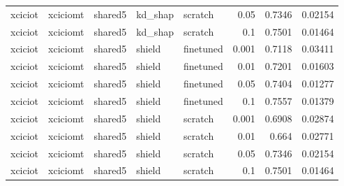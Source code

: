 \begin{table}
\begin{tabular}{lllllrrr}
xciciot & xciciomt & shared5 & kd_shap & scratch & 0.05 & 0.7346 & 0.02154 \\
xciciot & xciciomt & shared5 & kd_shap & scratch & 0.1 & 0.7501 & 0.01464 \\
xciciot & xciciomt & shared5 & shield & finetuned & 0.001 & 0.7118 & 0.03411 \\
xciciot & xciciomt & shared5 & shield & finetuned & 0.01 & 0.7201 & 0.01603 \\
xciciot & xciciomt & shared5 & shield & finetuned & 0.05 & 0.7404 & 0.01277 \\
xciciot & xciciomt & shared5 & shield & finetuned & 0.1 & 0.7557 & 0.01379 \\
xciciot & xciciomt & shared5 & shield & scratch & 0.001 & 0.6908 & 0.02874 \\
xciciot & xciciomt & shared5 & shield & scratch & 0.01 & 0.664 & 0.02771 \\
xciciot & xciciomt & shared5 & shield & scratch & 0.05 & 0.7346 & 0.02154 \\
xciciot & xciciomt & shared5 & shield & scratch & 0.1 & 0.7501 & 0.01464 \\
\bottomrule
\end{tabular}
\end{table}
